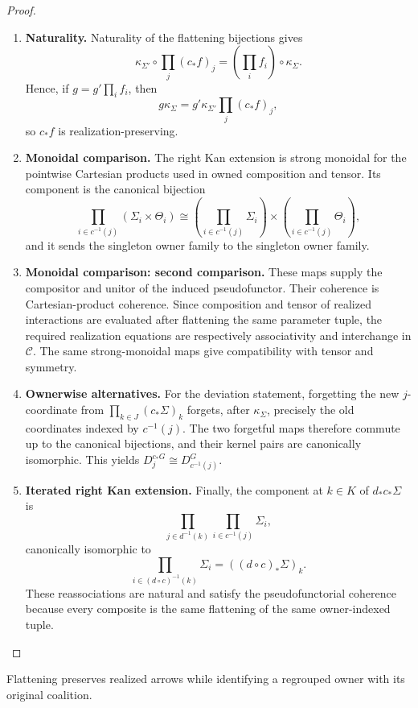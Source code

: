 \documentclass[11pt,a4paper]{article}
\numberwithin{equation}{section}
\theoremstyle{definition}
\theoremstyle{remark}
\theoremstyle{plain}
\begin{document}
\begin{proof}
\leavevmode
\begin{enumerate}[label=\textup{(\arabic*)},leftmargin=*,itemsep=4pt,topsep=3pt]
  \item \textbf{Naturality.} Naturality of the flattening bijections gives
\[
 \kappa_{\Sigma'}\circ\prod_j(c_*f)_j
 =\left(\prod_i f_i\right)\circ\kappa_\Sigma.
\]
Hence, if $g=g'\prod_i f_i$, then
\[
 g\kappa_\Sigma
 =g'\kappa_{\Sigma'}\prod_j(c_*f)_j,
\]
so $c_*f$ is realization-preserving.
  \item \textbf{Monoidal comparison.} The right Kan extension is strong monoidal for the pointwise Cartesian
products used in owned composition and tensor. Its component is the canonical
bijection
\[
 \prod_{i\in c^{-1}(j)}(\Sigma_i\times\Theta_i)
 \cong
 \left(\prod_{i\in c^{-1}(j)}\Sigma_i\right)
 \times
 \left(\prod_{i\in c^{-1}(j)}\Theta_i\right),
\]
and it sends the singleton owner family to the singleton owner family.
  \item \textbf{Monoidal comparison: second comparison.} These maps supply the compositor and unitor of the induced pseudofunctor. Their coherence is Cartesian-product coherence. Since composition and tensor
of realized interactions are evaluated after flattening the same parameter
tuple, the required realization equations are respectively associativity and
interchange in $\mathcal C$. The same strong-monoidal maps give compatibility
with tensor and symmetry.
  \item \textbf{Ownerwise alternatives.} For the deviation statement, forgetting the new $j$-coordinate from
$\prod_{k\in J}(c_*\Sigma)_k$ forgets, after $\kappa_\Sigma$, precisely the
old coordinates indexed by $c^{-1}(j)$. The two forgetful maps therefore
commute up to the canonical bijections, and their kernel pairs are
canonically isomorphic. This yields
$D_j^{c_*G}\cong D_{c^{-1}(j)}^G$.
  \item \textbf{Iterated right Kan extension.} Finally, the component at $k\in K$ of $d_*c_*\Sigma$ is
\[
 \prod_{j\in d^{-1}(k)}\prod_{i\in c^{-1}(j)}\Sigma_i,
\]
canonically isomorphic to
\[
 \prod_{i\in(d\circ c)^{-1}(k)}\Sigma_i
 =((d\circ c)_*\Sigma)_k.
\]
These reassociations are natural and satisfy the pseudofunctorial coherence
because every composite is the same flattening of the same owner-indexed
tuple.
\end{enumerate}
\end{proof}

\noindent Flattening preserves realized arrows while identifying a regrouped owner with its original coalition.
\begin{center}
\end{center}
\end{document}
